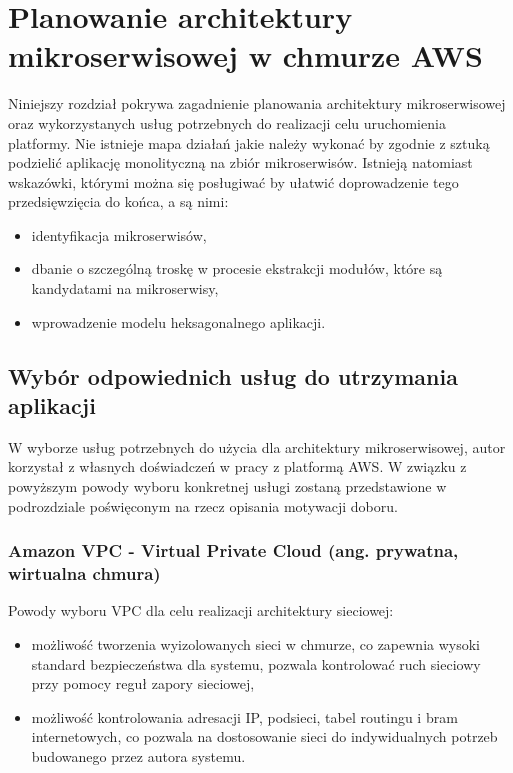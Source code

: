 \documentclass[12pt,twoside]{book}
\begin{document}
\chapter{Planowanie architektury mikroserwisowej w chmurze AWS}
Niniejszy rozdział pokrywa zagadnienie planowania architektury mikroserwisowej oraz wykorzystanych usług potrzebnych do realizacji celu uruchomienia platformy. Nie istnieje mapa działań jakie należy wykonać by zgodnie z sztuką podzielić aplikację monolityczną na zbiór mikroserwisów. Istnieją natomiast wskazówki, którymi można się posługiwać by ułatwić doprowadzenie tego przedsięwzięcia do końca, a są nimi:

\begin{itemize}
\item identyfikacja mikroserwisów,
\item dbanie o szczególną troskę w procesie ekstrakcji modułów, które są kandydatami na mikroserwisy,
\item wprowadzenie modelu heksagonalnego aplikacji. \cite{java.ee.8.design.patterns}
\end{itemize}

\section{Wybór odpowiednich usług do utrzymania aplikacji}
W wyborze usług potrzebnych do użycia dla architektury mikroserwisowej, autor korzystał z własnych doświadczeń w pracy z platformą AWS. W związku z powyższym powody wyboru konkretnej usługi zostaną przedstawione w podrozdziale poświęconym na rzecz opisania motywacji doboru.

\subsection{Amazon VPC - Virtual Private Cloud (ang. prywatna, wirtualna chmura)}
Powody wyboru VPC dla celu realizacji architektury sieciowej:

\begin{itemize}
\item możliwość tworzenia wyizolowanych sieci w chmurze, co zapewnia wysoki standard bezpieczeństwa dla systemu, pozwala kontrolować ruch sieciowy przy pomocy reguł zapory sieciowej,
\item możliwość kontrolowania adresacji IP, podsieci, tabel routingu i bram internetowych, co pozwala na dostosowanie sieci do indywidualnych potrzeb budowanego przez autora systemu. \cite{aws.vpc}
\end{itemize}
\end{document}
